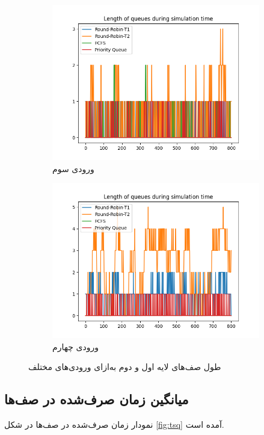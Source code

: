 \documentclass{article}
\begin{document}
\begin{figure}[h!]
\begin{subfigure}{.5\columnwidth}
		\includegraphics[width=\columnwidth]{figs/loq/queue-len-X-8-Y-6-Z-16-N-100-L-800-K-10-T1-2-T2-4.png}
		\caption{ورودی سوم}
	\end{subfigure}
	\begin{subfigure}{.5\columnwidth}
		\centering
		\includegraphics[width=\columnwidth]{figs/loq/queue-len-X-8-Y-8-Z-32-N-100-L-800-K-10-T1-6-T2-8.png}
		\caption{ورودی چهارم}
	\end{subfigure}
	\caption{طول صف‌های لایه اول و دوم به‌ازای ورودی‌های مختلف}
	\label{fig:loq}
\end{figure}

\subsection{میانگین زمان صرف‌شده در صف‌ها}
نمودار زمان صرف‌شده در صف‌ها در شکل \ref{fig:tsq} آمده است.
\end{document}
